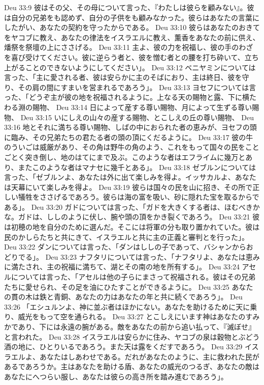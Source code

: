 Deu 33:9  彼はその父、その母について言った、『わたしは彼らを顧みない』。彼は自分の兄弟をも認めず、自分の子供をも顧みなかった。彼らはあなたの言葉にしたがい、あなたの契約を守ったからである。
Deu 33:10  彼らはあなたのおきてをヤコブに教え、あなたの律法をイスラエルに教え、薫香をあなたの前に供え、燔祭を祭壇の上にささげる。
Deu 33:11  主よ、彼の力を祝福し、彼の手のわざを喜び受けてください。彼に逆らう者と、彼を憎む者との腰を打ち砕いて、立ち上がることのできないようにしてください」。
Deu 33:12  ベニヤミンについては言った、「主に愛される者、彼は安らかに主のそばにおり、主は終日、彼を守り、その肩の間にすまいを営まれるであろう」。
Deu 33:13  ヨセフについては言った、「どうぞ主が彼の地を祝福されるように。上なる天の賜物と露、下に横たわる淵の賜物、
Deu 33:14  日によって産する尊い賜物、月によって生ずる尊い賜物、
Deu 33:15  いにしえの山々の産する賜物、とこしえの丘の尊い賜物、
Deu 33:16  地とそれに満ちる尊い賜物、しばの中におられた者の恵みが、ヨセフの頭に臨み、その兄弟たちの君たる者の頭の頂にくだるように。
Deu 33:17  彼の牛のういごは威厳があり、その角は野牛の角のよう、これをもって国々の民をことごとく突き倒し、地のはてにまで及ぶ。このような者はエフライムに幾万とあり、またこのような者はマナセに幾千とある」。
Deu 33:18  ゼブルンについては言った、「ゼブルンよ、あなたは外に出て楽しみを得よ。イッサカルよ、あなたは天幕にいて楽しみを得よ。
Deu 33:19  彼らは国々の民を山に招き、その所で正しい犠牲をささげるであろう。彼らは海の富を吸い、砂に隠れた宝を取るからである」。
Deu 33:20  ガドについては言った、「ガドを大きくする者は、ほむべきかな。ガドは、ししのように伏し、腕や頭の頂をかき裂くであろう。
Deu 33:21  彼は初穂の地を自分のために選んだ。そこには将軍の分も取り置かれていた。彼は民のかしらたちと共にきて、イスラエルと共に主の正義と審判とを行った」。
Deu 33:22  ダンについては言った、「ダンはししの子であって、バシャンからおどりでる」。
Deu 33:23  ナフタリについては言った、「ナフタリよ、あなたは恵みに満たされ、主の祝福に満ちて、湖とその南の地を所有する」。
Deu 33:24  アセルについては言った、「アセルは他の子らにまさって祝福される。彼はその兄弟たちに愛せられ、その足を油にひたすことができるように。
Deu 33:25  あなたの貫の木は鉄と青銅、あなたの力はあなたの年と共に続くであろう」。
Deu 33:26  「エシュルンよ、神に並ぶ者はほかにない。あなたを助けるために天に乗り、威光をもって空を通られる。
Deu 33:27  とこしえにいます神はあなたのすみかであり、下には永遠の腕がある。敵をあなたの前から追い払って、『滅ぼせ』と言われた。
Deu 33:28  イスラエルは安らかに住み、ヤコブの泉は穀物とぶどう酒の地に、ひとりいるであろう。また天は露をくだすであろう。
Deu 33:29  イスラエルよ、あなたはしあわせである。だれがあなたのように、主に救われた民があるであろうか。主はあなたを助ける盾、あなたの威光のつるぎ、あなたの敵はあなたにへつらい服し、あなたは彼らの高き所を踏み進むであろう」。
